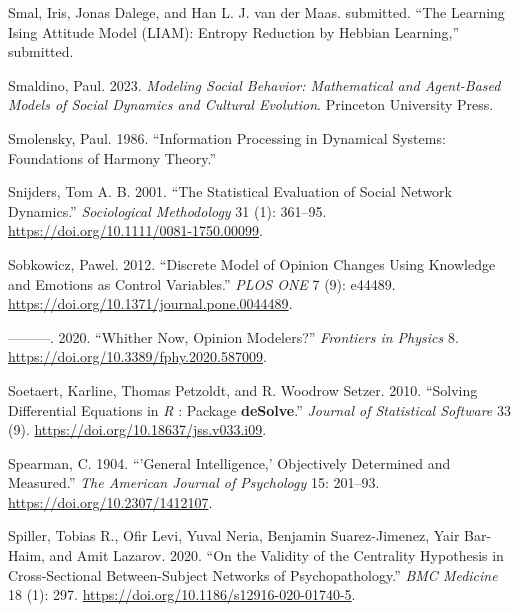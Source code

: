 \documentclass[
  a4paper,
  DIV=11,
  numbers=noendperiod,
  oneside]{scrreprt}
\newlength{\cslhangindent}
\newenvironment{CSLReferences}[2] %
 {\begin{list}{}{%
  \setlength{\itemindent}{0pt}
  \setlength{\leftmargin}{0pt}
  \setlength{\parsep}{0pt}
  \ifodd #1
   \setlength{\leftmargin}{\cslhangindent}
   \setlength{\itemindent}{-1\cslhangindent}
  \fi
  \setlength{\itemsep}{#2\baselineskip}}}
 {\end{list}}
\begin{document}
\begin{CSLReferences}{1}{0}
Smal, Iris, Jonas Dalege, and Han L. J. van der Maas. submitted. {``The
{Learning Ising Attitude Model} ({LIAM}): {Entropy Reduction} by
{Hebbian Learning},''} submitted.

Smaldino, Paul. 2023. \emph{Modeling Social Behavior: Mathematical and
Agent-Based Models of Social Dynamics and Cultural Evolution}. Princeton
University Press.

Smolensky, Paul. 1986. {``Information {Processing} in {Dynamical
Systems}: {Foundations} of {Harmony Theory}.''}

Snijders, Tom A. B. 2001. {``The {Statistical Evaluation} of {Social
Network Dynamics}.''} \emph{Sociological Methodology} 31 (1): 361--95.
\url{https://doi.org/10.1111/0081-1750.00099}.

Sobkowicz, Pawel. 2012. {``Discrete {Model} of {Opinion Changes Using
Knowledge} and {Emotions} as {Control Variables}.''} \emph{PLOS ONE} 7
(9): e44489. \url{https://doi.org/10.1371/journal.pone.0044489}.

---------. 2020. {``Whither {Now}, {Opinion Modelers}?''}
\emph{Frontiers in Physics} 8.
\url{https://doi.org/10.3389/fphy.2020.587009}.

Soetaert, Karline, Thomas Petzoldt, and R. Woodrow Setzer. 2010.
{``Solving Differential Equations in {\emph{R}} : Package
{\textbf{deSolve}}.''} \emph{Journal of Statistical Software} 33 (9).
\url{https://doi.org/10.18637/jss.v033.i09}.

Spearman, C. 1904. {``'{General} Intelligence,' Objectively Determined
and Measured.''} \emph{The American Journal of Psychology} 15: 201--93.
\url{https://doi.org/10.2307/1412107}.

Spiller, Tobias R., Ofir Levi, Yuval Neria, Benjamin Suarez-Jimenez,
Yair Bar-Haim, and Amit Lazarov. 2020. {``On the Validity of the
Centrality Hypothesis in Cross-Sectional Between-Subject Networks of
Psychopathology.''} \emph{BMC Medicine} 18 (1): 297.
\url{https://doi.org/10.1186/s12916-020-01740-5}.


\end{CSLReferences}
\end{document}
